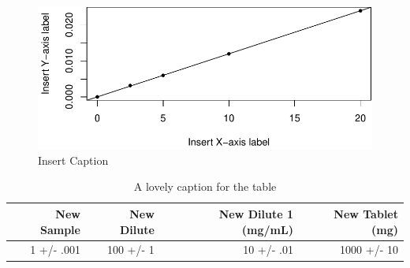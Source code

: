 \documentclass[]{article}
\begin{document}
\begin{figure}[htbp]
\centering
\includegraphics{Iron_Analysis_files/figure-latex/unnamed-chunk-4-1.pdf}
\caption{Insert Caption}
\end{figure}

\begin{table}[ht]
\centering
\parbox{2.7in}{\caption{A lovely caption for the table}} 
\begin{tabular}{|r|r|r|r|}
  \hline
\textbf{New Sample} & \textbf{New Dilute} & \textbf{New Dilute 1 (mg/mL)} & \textbf{New Tablet (mg)} \\ 
  \hline
1 +/- .001 & 100 +/- 1 & 10 +/- .01 & 1000 +/- 10 \\ 
   \hline
\end{tabular}
\end{table}
\end{document}
